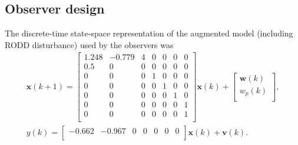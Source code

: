 \subsection{Observer design}

The discrete-time state-space representation of the augmented model (including RODD disturbance) used by the observers was
\begin{multline} \label{eq:obs_ss_model}
	\mathbf{x}(k+1) = 
	\begin{bmatrix}
		1.248 & -0.779 & 4 & 0 & 0 & 0 & 0 \\
		0.5   &  0      & 0 & 0 & 0 & 0 & 0 \\
		0     &  0      & 0 & 1 & 0 & 0 & 0 \\
		0     &  0      & 0 & 0 & 1 & 0 & 0 \\
		0     &  0      & 0 & 0 & 0 & 1 & 0 \\
		0     &  0      & 0 & 0 & 0 & 0 & 1 \\
		0     &  0      & 0 & 0 & 0 & 0 & 1 \\
	\end{bmatrix} \mathbf{x}(k)
	+ \begin{bmatrix}
		\mathbf{w}(k) \\
		w_p(k) \\
	\end{bmatrix}, \\
	y(k) = 
	\begin{bmatrix}
		-0.662 & -0.967 & 0 & 0 & 0 & 0 & 0 \\
	\end{bmatrix} \mathbf{x}(k) + \mathbf{v}(k). \\
\end{multline}


